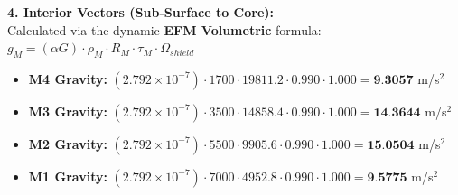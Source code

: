 \documentclass[11pt, a4paper]{article}
\begin{document}
  \vspace{0.5em}
  \noindent \textbf{4. Interior Vectors (Sub-Surface to Core):} \\[0.5em]
  \hspace*{1em} Calculated via the dynamic \textbf{EFM Volumetric} formula: $g_M = (\alpha G) \cdot \rho_{M} \cdot R_M \cdot \tau_M \cdot \Omega_{shield}$
  \begin{itemize}
    \item \textbf{M4 Gravity:} $(2.792 \times 10^{-7}) \cdot 1700 \cdot 19811.2 \cdot 0.990 \cdot 1.000 = \textbf{9.3057}$ m/s$^2$
    \item \textbf{M3 Gravity:} $(2.792 \times 10^{-7}) \cdot 3500 \cdot 14858.4 \cdot 0.990 \cdot 1.000 = \textbf{14.3644}$ m/s$^2$
    \item \textbf{M2 Gravity:} $(2.792 \times 10^{-7}) \cdot 5500 \cdot 9905.6 \cdot 0.990 \cdot 1.000 = \textbf{15.0504}$ m/s$^2$
    \item \textbf{M1 Gravity:} $(2.792 \times 10^{-7}) \cdot 7000 \cdot 4952.8 \cdot 0.990 \cdot 1.000 = \textbf{9.5775}$ m/s$^2$
  \end{itemize}
\end{document}
